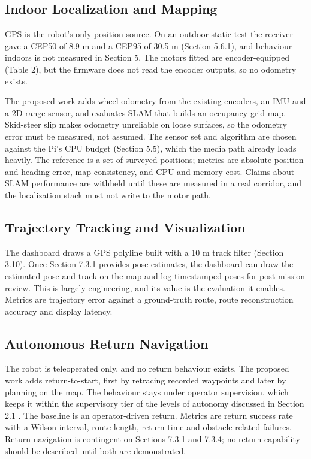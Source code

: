 \subsection{Indoor Localization and Mapping}

GPS is the robot's only position source. On an outdoor static test the receiver gave a CEP50 of 8.9 m and a CEP95 of 30.5 m (Section 5.6.1), and behaviour indoors is not measured in Section 5. The motors fitted are encoder-equipped (Table 2), but the firmware does not read the encoder outputs, so no odometry exists.

The proposed work adds wheel odometry from the existing encoders, an IMU and a 2D range sensor, and evaluates SLAM that builds an occupancy-grid map. Skid-steer slip makes odometry unreliable on loose surfaces, so the odometry error must be measured, not assumed. The sensor set and algorithm are chosen against the Pi's CPU budget (Section 5.5), which the media path already loads heavily. The reference is a set of surveyed positions; metrics are absolute position and heading error, map consistency, and CPU and memory cost. Claims about SLAM performance are withheld until these are measured in a real corridor, and the localization stack must not write to the motor path.

\subsection{Trajectory Tracking and Visualization}

The dashboard draws a GPS polyline built with a 10 m track filter (Section 3.10). Once Section 7.3.1 provides pose estimates, the dashboard can draw the estimated pose and track on the map and log timestamped poses for post-mission review. This is largely engineering, and its value is the evaluation it enables. Metrics are trajectory error against a ground-truth route, route reconstruction accuracy and display latency.

\subsection{Autonomous Return Navigation}

The robot is teleoperated only, and no return behaviour exists. The proposed work adds return-to-start, first by retracing recorded waypoints and later by planning on the map. The behaviour stays under operator supervision, which keeps it within the supervisory tier of the levels of autonomy discussed in Section 2.1 \cite{beer2014,schneider2016}. The baseline is an operator-driven return. Metrics are return success rate with a Wilson interval, route length, return time and obstacle-related failures. Return navigation is contingent on Sections 7.3.1 and 7.3.4; no return capability should be described until both are demonstrated.

